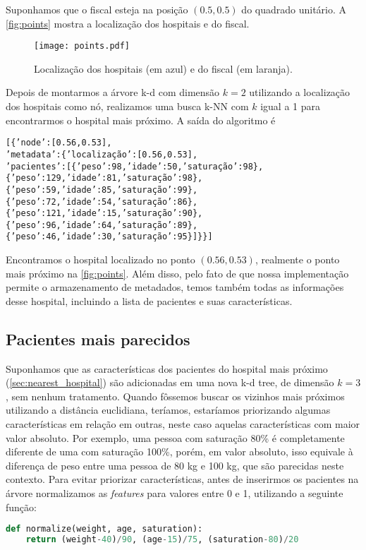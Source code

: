         Suponhamos que o fiscal esteja na posição $(0.5, 0.5)$ do quadrado unitário. A \autoref{fig:points} mostra a localização dos hospitais e do fiscal.
        \begin{figure}[H]
            \centering
            \texttt{[image: points.pdf]}
            \caption{Localização dos hospitais (em azul) e do fiscal (em laranja).}
            \label{fig:points}
        \end{figure}
        Depois de montarmos a árvore k-d com dimensão $k=2$ utilizando a localização dos hospitais como nó, realizamos uma busca k-NN com $k$ igual a 1 para encontrarmos o hospital mais próximo. A saída do algoritmo é
        \begin{alltt}
[\{'node': [0.56, 0.53],
  'metadata': \{'localização': [0.56, 0.53],
   'pacientes': [\{'peso': 98, 'idade': 50, 'saturação': 98\},
    \{'peso': 129, 'idade': 81, 'saturação': 98\},
    \{'peso': 59, 'idade': 85, 'saturação': 99\},
    \{'peso': 72, 'idade': 54, 'saturação': 86\},
    \{'peso': 121, 'idade': 15, 'saturação': 90\},
    \{'peso': 96, 'idade': 64, 'saturação': 89\},
    \{'peso': 46, 'idade': 30, 'saturação': 95\}]\}\}]
        \end{alltt}
        Encontramos o hospital localizado no ponto $(0.56, 0.53)$, realmente o ponto mais próximo na \autoref{fig:points}. Além disso, pelo fato de que nossa implementação permite o armazenamento de metadados, temos também todas as informações desse hospital, incluindo a lista de pacientes e suas características.

    \subsection{Pacientes mais parecidos}

        Suponhamos que as características dos pacientes do hospital mais próximo (\autoref{sec:nearest_hospital}) são adicionadas em uma nova k-d tree, de dimensão $k=3$, sem nenhum tratamento. Quando fôssemos buscar os vizinhos mais próximos utilizando a distância euclidiana, teríamos, estaríamos priorizando algumas características em relação em outras, neste caso aquelas características com maior valor absoluto. Por exemplo, uma pessoa com saturação 80\% é completamente diferente de uma com saturação 100\%, porém, em valor absoluto, isso equivale à diferença de peso entre uma pessoa de 80 kg e 100 kg, que são parecidas neste contexto. Para evitar priorizar características, antes de inserirmos os pacientes na árvore normalizamos as \textit{features} para valores entre 0 e 1, utilizando a seguinte função:
        \begin{lstlisting}[language=Python]
def normalize(weight, age, saturation):
    return (weight-40)/90, (age-15)/75, (saturation-80)/20
        \end{lstlisting}

